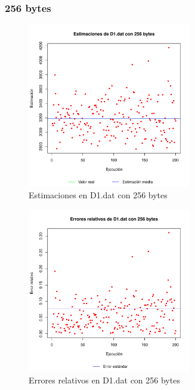 \subsubsection{256 bytes}
\begin{figure}[h!]
    \centering
        \includegraphics[width=0.64\textwidth]{../figs/D1/plot_estimation_256.pdf}
        \caption{Estimaciones en D1.dat con 256 bytes}
    \label{figura:D1_estimation_256}
\end{figure}

\begin{figure}[h!]
    \centering
        \includegraphics[width=0.64\textwidth]{../figs/D1/plot_errors_256.pdf}
        \caption{Errores relativos en D1.dat con 256 bytes}
    \label{figura:D1_errors_256}
\end{figure}

